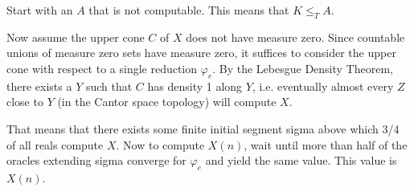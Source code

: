 \documentclass[12pt]{article}
\begin{document}
Start with an $A$ that is not computable.  This means that $K \le_T A$.

Now assume the upper cone $C$ of $X$ does not have measure zero. 
Since countable unions of measure zero sets have measure zero, it suffices to consider the upper cone with respect to a single reduction $\varphi_e$. 
By the Lebesgue Density Theorem, there exists a $Y$ such that $C$ has density 1 along $Y$, i.e. eventually almost every $Z$ close to $Y$ (in the Cantor space topology) will compute $X$. 

That means that there exists some finite initial segment sigma above which 3/4 of all reals compute $X$. Now to compute $X(n)$, wait until more than half of the oracles extending sigma converge for $\varphi_e$ and yield the same value. This value is $X(n)$.
\end{document}

